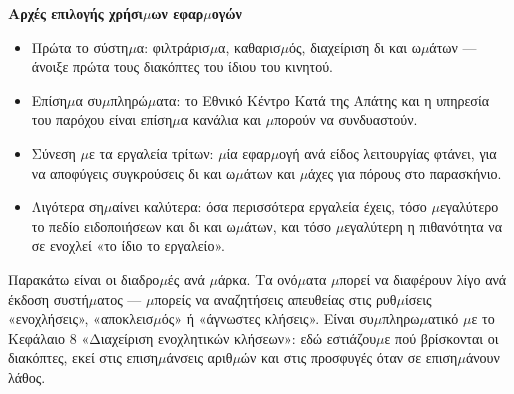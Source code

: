 \textbf{Αρχές επιλογής χρήσι$\mu$ων εφαρ$\mu$ογών}\par

\begin{itemize}
  \item Πρώτα το σύστη$\mu$α: φιλτράρισ$\mu$α, καθαρισ$\mu$ός, διαχείριση δι και ω$\mu$άτων — άνοιξε πρώτα τους διακόπτες του ίδιου του κινητού.
  \item Επίση$\mu$α συ$\mu$πληρώ$\mu$ατα: το Εθνικό Κέντρο Κατά της Απάτης και η υπηρεσία του παρόχου είναι επίση$\mu$α κανάλια και $\mu$πορούν να συνδυαστούν.
  \item Σύνεση $\mu$ε τα εργαλεία τρίτων: $\mu$ία εφαρ$\mu$ογή ανά είδος λειτουργίας φτάνει, για να αποφύγεις συγκρούσεις δι και ω$\mu$άτων και $\mu$άχες για πόρους στο παρασκήνιο.
  \item Λιγότερα ση$\mu$αίνει καλύτερα: όσα περισσότερα εργαλεία έχεις, τόσο $\mu$εγαλύτερο το πεδίο ειδοποιήσεων και δι και ω$\mu$άτων, και τόσο $\mu$εγαλύτερη η πιθανότητα να σε ενοχλεί «το ίδιο το εργαλείο».
\end{itemize}


Παρακάτω είναι οι διαδρο$\mu$ές ανά $\mu$άρκα. Τα ονό$\mu$ατα $\mu$πορεί να διαφέρουν λίγο ανά έκδοση συστή$\mu$ατος — $\mu$πορείς να αναζητήσεις απευθείας στις ρυθ$\mu$ίσεις «ενοχλήσεις», «αποκλεισ$\mu$ός» ή «άγνωστες κλήσεις». Είναι συ$\mu$πληρω$\mu$ατικό $\mu$ε το Κεφάλαιο 8 «Διαχείριση ενοχλητικών κλήσεων»: εδώ εστιάζου$\mu$ε πού βρίσκονται οι διακόπτες, εκεί στις επιση$\mu$άνσεις αριθ$\mu$ών και στις προσφυγές όταν σε επιση$\mu$άνουν λάθος.

